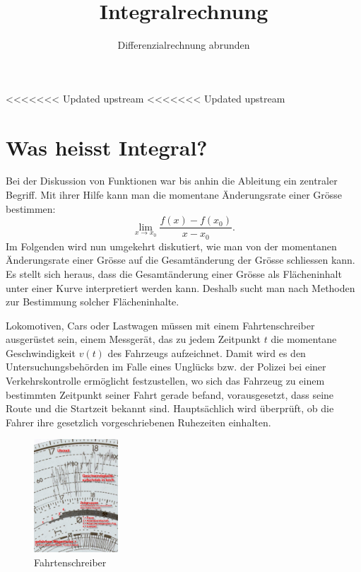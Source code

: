 \documentclass[%
<<<<<<< Updated upstream
<<<<<<< Updated upstream
11pt,%
twoside,%
titlepage,%
german,%
headsepline%
]{scrartcl}
\title{Integralrechnung}
\subtitle{Differenzialrechnung abrunden}
\author{}
\date{}
\begin{document}
\maketitle
\tableofcontents
\cleardoublepage

<<<<<<< Updated upstream
<<<<<<< Updated upstream
\section{Was heisst Integral?}

Bei der Diskussion von Funktionen war bis anhin die Ableitung ein zentraler Begriff. Mit ihrer Hilfe kann man die momentane Änderungsrate einer Grösse bestimmen:
$$\lim_{x\rightarrow x_0}\frac{f(x)-f(x_0)}{x-x_0}.$$
Im Folgenden wird nun umgekehrt diskutiert, wie man von der momentanen Änderungsrate einer Grösse auf die Gesamtänderung der Grösse schliessen kann. Es stellt sich heraus, dass die Gesamtänderung einer Grösse als Flächeninhalt unter einer Kurve interpretiert werden kann. Deshalb sucht man nach Methoden zur Bestimmung solcher Flächeninhalte.

Lokomotiven, Cars oder Lastwagen müssen mit einem Fahrtenschreiber ausgerüstet sein, einem Messgerät, das zu jedem Zeitpunkt $t$ die momentane Geschwindigkeit $v(t)$ des Fahrzeugs aufzeichnet. Damit wird es den Untersuchungsbehörden im Falle eines Unglücks bzw. der Polizei bei einer Verkehrskontrolle ermöglicht festzustellen, wo sich das Fahrzeug zu einem bestimmten Zeitpunkt seiner Fahrt gerade befand, vorausgesetzt, dass seine Route und die Startzeit bekannt sind. Hauptsächlich wird überprüft, ob die Fahrer ihre gesetzlich vorgeschriebenen Ruhezeiten einhalten.

\begin{figure}[h!t]
\begin{center}
\includegraphics[width=0.28\textwidth]{pictures/tachozoom}
\end{center}
\caption{Fahrtenschreiber}\label{abb:schreiber}
\end{figure}
\end{document}
